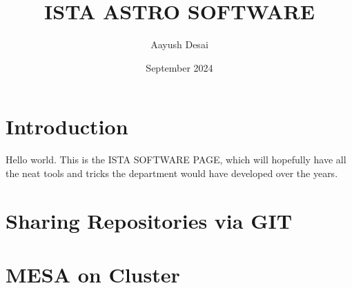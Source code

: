 \documentclass{article}
\title{ISTA ASTRO SOFTWARE}
\author{Aayush Desai}
\date{September 2024}
\begin{document}
\maketitle

\section*{Introduction}

Hello world. This is the ISTA SOFTWARE PAGE, which will hopefully have all the neat tools and tricks the department would have developed over the years. 

\section{Sharing Repositories via GIT}
\section{MESA on Cluster}
\end{document}
